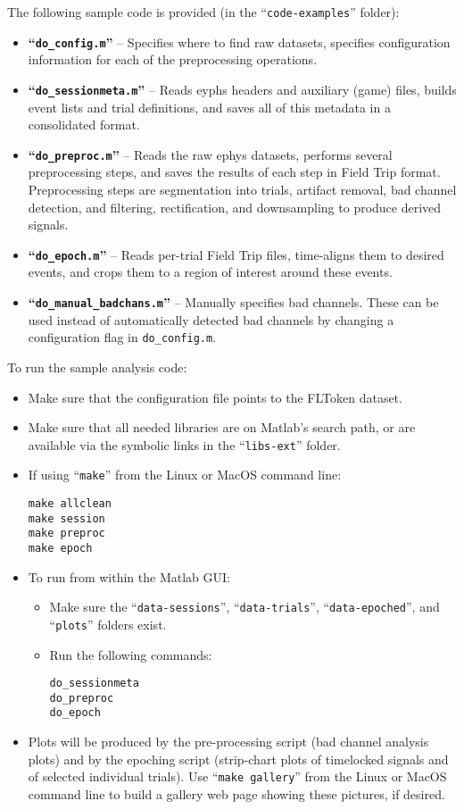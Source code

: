 The following sample code is provided (in the ``\texttt{code-examples}''
folder):
\begin{itemize}
%
\item \textbf{``\texttt{do\_config.m}''} --
Specifies where to find raw datasets, specifies configuration information
for each of the preprocessing operations.
%
\item \textbf{``\texttt{do\_sessionmeta.m}''} --
Reads eyphs headers and auxiliary (game) files, builds event lists and trial
definitions, and saves all of this metadata in a consolidated format.
%
\item \textbf{``\texttt{do\_preproc.m}''} --
Reads the raw ephys datasets, performs several preprocessing steps, and
saves the results of each step in Field Trip format. Preprocessing steps
are segmentation into trials, artifact removal, bad channel detection,
and filtering, rectification, and downsampling to produce derived signals.
%
\item \textbf{``\texttt{do\_epoch.m}''} --
Reads per-trial Field Trip files, time-aligns them to desired events, and
crops them to a region of interest around these events.
%
\item \textbf{``\texttt{do\_manual\_badchans.m}''} --
Manually specifies bad channels. These can be used instead of automatically
detected bad channels by changing a configuration flag in
\texttt{do\_config.m}.
%
\end{itemize}

To run the sample analysis code:
\begin{itemize}
\item Make sure that the configuration file points to the FLToken dataset.
\item Make sure that all needed libraries are on Matlab's search path, or
are available via the symbolic links in the ``\texttt{libs-ext}'' folder.
\item If using ``\texttt{make}'' from the Linux or MacOS command line:
\begin{verbatim}
make allclean
make session
make preproc
make epoch
\end{verbatim}
\item To run from within the Matlab GUI:
\begin{itemize}
\item Make sure the ``\texttt{data-sessions}'', ``\texttt{data-trials}'',
``\texttt{data-epoched}'', and ``\texttt{plots}'' folders exist.
\item Run the following commands:
\begin{verbatim}
do_sessionmeta
do_preproc
do_epoch
\end{verbatim}
\end{itemize}
\item Plots will be produced by the pre-processing script (bad channel
analysis plots) and by the epoching script (strip-chart plots of timelocked
signals and of selected individual trials). Use ``\texttt{make gallery}''
from the Linux or MacOS command line to build a gallery web page showing
these pictures, if desired.
\end{itemize}

%
